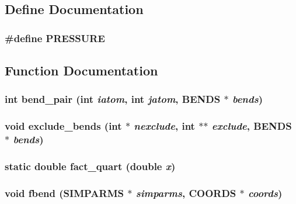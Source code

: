 \subsection{Define Documentation}
\subsubsection{\setlength{\rightskip}{0pt plus 5cm}\#define PRESSURE}\label{md__fbend_8c_67bafb91da1f123097b90c52747bcf36}




\subsection{Function Documentation}
\subsubsection{\setlength{\rightskip}{0pt plus 5cm}int bend\_\-pair (int {\em iatom}, int {\em jatom}, {\bf BENDS} $\ast$ {\em bends})}\label{md__fbend_8c_e484dcc5cc504c79b133bc1fb44a6f8d}


\subsubsection{\setlength{\rightskip}{0pt plus 5cm}void exclude\_\-bends (int $\ast$ {\em nexclude}, int $\ast$$\ast$ {\em exclude}, {\bf BENDS} $\ast$ {\em bends})}\label{md__fbend_8c_d898731dfdf6d06afcdd7d991700d495}


\subsubsection{\setlength{\rightskip}{0pt plus 5cm}static double fact\_\-quart (double {\em x})\hspace{0.3cm}{\tt  [static]}}\label{md__fbend_8c_a77e588a6aa759c876692c0c99fa7987}


\subsubsection{\setlength{\rightskip}{0pt plus 5cm}void fbend ({\bf SIMPARMS} $\ast$ {\em simparms}, {\bf COORDS} $\ast$ {\em coords})}\label{md__fbend_8c_c21bb9b6f8246265fc0f3269d9233183}


